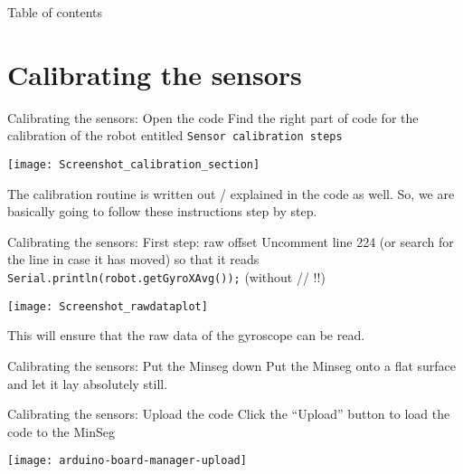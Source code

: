 \begin{frame}{Table of contents}
	\tableofcontents
\end{frame}

\section{Calibrating the sensors}

\begin{frame}{Calibrating the sensors: Open the code}
	Find the right part of code for the calibration of the robot entitled
	\texttt{Sensor calibration steps}
	\begin{center}
		\texttt{[image: Screenshot\_calibration\_section]}
	\end{center}
	The calibration routine is written out / explained in the code as well. So, we are basically going to follow these instructions step by step.
\end{frame}



\begin{frame}{Calibrating the sensors: First step: raw offset}
	Uncomment line 224 (or search for the line in case it has moved) so that it reads \texttt{Serial.println(robot.getGyroXAvg());} (without // !!)
	\begin{center}
		\texttt{[image: Screenshot\_rawdataplot]}
	\end{center}
	This will ensure that the raw data of the gyroscope can be read.
\end{frame}

%
%
%
%
%


\begin{frame}{Calibrating the sensors: Put the Minseg down}
	Put the Minseg onto a flat surface and let it lay absolutely still.
\end{frame}

\begin{frame}{Calibrating the sensors: Upload the code}
	Click the ``Upload'' button to load the code to the MinSeg
	\begin{center}
		\texttt{[image: arduino-board-manager-upload]}
	\end{center}
\end{frame}

